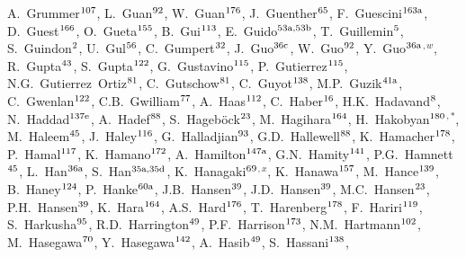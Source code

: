 \begin{flushleft}
A.~Grummer$^\textrm{\scriptsize 107}$,
L.~Guan$^\textrm{\scriptsize 92}$,
W.~Guan$^\textrm{\scriptsize 176}$,
J.~Guenther$^\textrm{\scriptsize 65}$,
F.~Guescini$^\textrm{\scriptsize 163a}$,
D.~Guest$^\textrm{\scriptsize 166}$,
O.~Gueta$^\textrm{\scriptsize 155}$,
B.~Gui$^\textrm{\scriptsize 113}$,
E.~Guido$^\textrm{\scriptsize 53a,53b}$,
T.~Guillemin$^\textrm{\scriptsize 5}$,
S.~Guindon$^\textrm{\scriptsize 2}$,
U.~Gul$^\textrm{\scriptsize 56}$,
C.~Gumpert$^\textrm{\scriptsize 32}$,
J.~Guo$^\textrm{\scriptsize 36c}$,
W.~Guo$^\textrm{\scriptsize 92}$,
Y.~Guo$^\textrm{\scriptsize 36a}$$^{,w}$,
R.~Gupta$^\textrm{\scriptsize 43}$,
S.~Gupta$^\textrm{\scriptsize 122}$,
G.~Gustavino$^\textrm{\scriptsize 115}$,
P.~Gutierrez$^\textrm{\scriptsize 115}$,
N.G.~Gutierrez~Ortiz$^\textrm{\scriptsize 81}$,
C.~Gutschow$^\textrm{\scriptsize 81}$,
C.~Guyot$^\textrm{\scriptsize 138}$,
M.P.~Guzik$^\textrm{\scriptsize 41a}$,
C.~Gwenlan$^\textrm{\scriptsize 122}$,
C.B.~Gwilliam$^\textrm{\scriptsize 77}$,
A.~Haas$^\textrm{\scriptsize 112}$,
C.~Haber$^\textrm{\scriptsize 16}$,
H.K.~Hadavand$^\textrm{\scriptsize 8}$,
N.~Haddad$^\textrm{\scriptsize 137e}$,
A.~Hadef$^\textrm{\scriptsize 88}$,
S.~Hageb\"ock$^\textrm{\scriptsize 23}$,
M.~Hagihara$^\textrm{\scriptsize 164}$,
H.~Hakobyan$^\textrm{\scriptsize 180}$$^{,*}$,
M.~Haleem$^\textrm{\scriptsize 45}$,
J.~Haley$^\textrm{\scriptsize 116}$,
G.~Halladjian$^\textrm{\scriptsize 93}$,
G.D.~Hallewell$^\textrm{\scriptsize 88}$,
K.~Hamacher$^\textrm{\scriptsize 178}$,
P.~Hamal$^\textrm{\scriptsize 117}$,
K.~Hamano$^\textrm{\scriptsize 172}$,
A.~Hamilton$^\textrm{\scriptsize 147a}$,
G.N.~Hamity$^\textrm{\scriptsize 141}$,
P.G.~Hamnett$^\textrm{\scriptsize 45}$,
L.~Han$^\textrm{\scriptsize 36a}$,
S.~Han$^\textrm{\scriptsize 35a,35d}$,
K.~Hanagaki$^\textrm{\scriptsize 69}$$^{,x}$,
K.~Hanawa$^\textrm{\scriptsize 157}$,
M.~Hance$^\textrm{\scriptsize 139}$,
B.~Haney$^\textrm{\scriptsize 124}$,
P.~Hanke$^\textrm{\scriptsize 60a}$,
J.B.~Hansen$^\textrm{\scriptsize 39}$,
J.D.~Hansen$^\textrm{\scriptsize 39}$,
M.C.~Hansen$^\textrm{\scriptsize 23}$,
P.H.~Hansen$^\textrm{\scriptsize 39}$,
K.~Hara$^\textrm{\scriptsize 164}$,
A.S.~Hard$^\textrm{\scriptsize 176}$,
T.~Harenberg$^\textrm{\scriptsize 178}$,
F.~Hariri$^\textrm{\scriptsize 119}$,
S.~Harkusha$^\textrm{\scriptsize 95}$,
R.D.~Harrington$^\textrm{\scriptsize 49}$,
P.F.~Harrison$^\textrm{\scriptsize 173}$,
N.M.~Hartmann$^\textrm{\scriptsize 102}$,
M.~Hasegawa$^\textrm{\scriptsize 70}$,
Y.~Hasegawa$^\textrm{\scriptsize 142}$,
A.~Hasib$^\textrm{\scriptsize 49}$,
S.~Hassani$^\textrm{\scriptsize 138}$,
$$
\end{flushleft}
